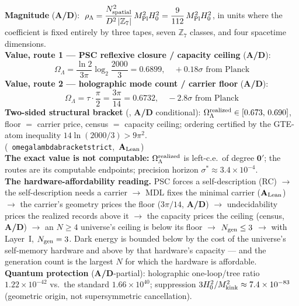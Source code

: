 \documentclass[11pt]{article}
\theoremstyle{remark}
\newcommand{\ZS}{\mathbb{Z}_7}
\newcommand{\lean}[1]{%
  \penalty-100
  \begingroup\def\_{\textunderscore\allowbreak}\texttt{#1}\endgroup}
\newcommand{\Mkink}{M_{\rm kink}}
\newcommand{\MPl}{M_{\rm Pl}}
\newcommand{\Hnought}{H_0}
\newcommand{\OmL}{\Omega_\Lambda}
\newcommand{\CatAL}{\ensuremath{\textbf{A}_{\rm Lean}}}
\newcommand{\CatAD}{\textbf{A/D}}
\begin{document}
\begin{tcolorbox}[colback=orange!8,colframe=orange!60!black,
  title={\textbf{Key Result: Cosmological Constant at Three Levels}},
  fonttitle=\bfseries,left=6pt,right=6pt,top=5pt,bottom=5pt,breakable]
\small
\textbf{Magnitude} (\CatAD): $\;\rho_\Lambda =
\dfrac{N_{\rm spatial}^2}{D^2\,|\ZS|}\,\MPl^2\Hnought^2
= \dfrac{9}{112}\,\MPl^2\Hnought^2$,\;
in units where the coefficient is fixed entirely by three tapes, seven $\ZS$
classes, and four spacetime dimensions.\\[4pt]
\textbf{Value, route 1 — PSC reflexive closure / capacity ceiling} (\CatAD):
\[\OmL = \frac{\ln 2}{3\pi}\log_2\!\frac{2000}{3} = 0.6899,\quad +0.18\sigma
\text{ from Planck}\]
\textbf{Value, route 2 — holographic mode count / carrier floor} (\CatAD):
\[\OmL = \tau\cdot\frac{\pi}{2} = \frac{3\pi}{14} = 0.6732,\quad -2.8\sigma
\text{ from Planck}\]
\textbf{Two-sided structural bracket} (, \CatAD{} conditional):
$\OmL^{\rm realized} \in [0.673,\,0.690]$, floor $=$ carrier price, census $=$
capacity ceiling; ordering certified by the GTE-atom inequality
$14\ln(2000/3) > 9\pi^2$.\\
\mbox{(\lean{omega\_lambda\_bracket\_strict}, \CatAL)}\\[4pt]
\textbf{The exact value is not computable:} $\OmL^{\rm realized}$ is
left-c.e.\ of degree $\mathbf{0}'$; the routes are its computable endpoints;
precision horizon $\sigma^* \approx 3.4\times10^{-4}$.\\[4pt]
\textbf{The hardware-affordability reading.}
PSC forces a self-description (RC) $\to$ the self-description needs a carrier
$\to$ MDL fixes the minimal carrier (\CatAL) $\to$ the carrier's geometry
prices the floor ($3\pi/14$, \CatAD) $\to$ undecidability prices the realized
records above it $\to$ the capacity prices the ceiling (census, \CatAD) $\to$
an $N \ge 4$ universe's ceiling is below its floor $\to$ $N_{\rm gen} \le 3$
$\to$ with Layer~I, $N_{\rm gen} = 3$. Dark energy is bounded below by the cost
of the universe's self-memory hardware and above by that hardware's capacity
--- and the generation count is the largest $N$ for which the hardware is
affordable.\\[4pt]
\textbf{Quantum protection} (\CatAD-partial):
holographic one-loop/tree ratio $1.22\times10^{-42}$ vs.\ the standard
$1.66\times10^{40}$; suppression $3\Hnought^2/\Mkink^2\approx7.4\times10^{-83}$
(geometric origin, not supersymmetric cancellation).
\end{tcolorbox}
\end{document}
